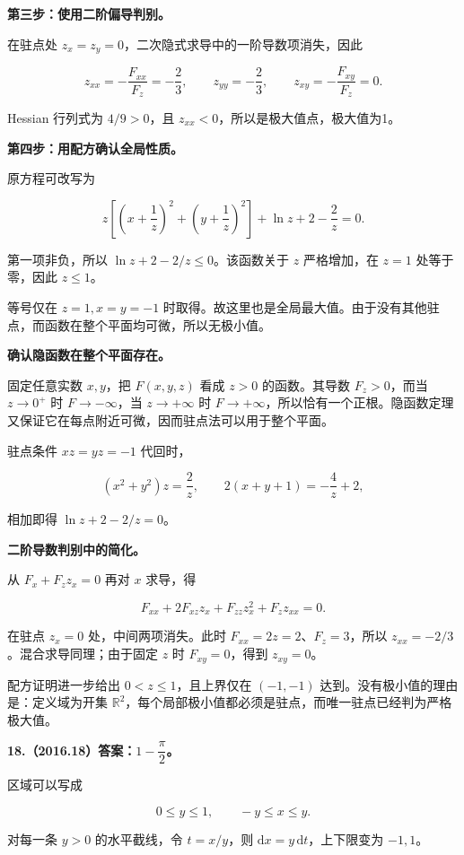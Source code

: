\documentclass[UTF8,11pt,fontset=windows]{ctexart}
\begin{document}
\textbf{第三步：使用二阶偏导判别。}

在驻点处 $z_x=z_y=0$，二次隐式求导中的一阶导数项消失，因此

$$
z_{xx}=-\frac{F_{xx}}{F_z}=-\frac23,
\qquad z_{yy}=-\frac23,
\qquad z_{xy}=-\frac{F_{xy}}{F_z}=0.
$$

Hessian 行列式为 $4/9>0$，且 $z_{xx}<0$，所以是极大值点，极大值为1。

\textbf{第四步：用配方确认全局性质。}

原方程可改写为

$$
z\left[\left(x+\frac1z\right)^2+\left(y+\frac1z\right)^2\right]
+\ln z+2-\frac2z=0.
$$

第一项非负，所以 $\ln z+2-2/z\le0$。该函数关于 $z$ 严格增加，在 $z=1$ 处等于零，因此 $z\le1$。

等号仅在 $z=1,x=y=-1$ 时取得。故这里也是全局最大值。由于没有其他驻点，而函数在整个平面均可微，所以无极小值。

\textbf{确认隐函数在整个平面存在。}

固定任意实数 $x,y$，把 $F(x,y,z)$ 看成 $z>0$ 的函数。其导数 $F_z>0$，而当 $z\to0^+$ 时 $F\to-\infty$，当 $z\to+\infty$ 时 $F\to+\infty$，所以恰有一个正根。隐函数定理又保证它在每点附近可微，因而驻点法可以用于整个平面。

驻点条件 $xz=yz=-1$ 代回时，

$$
(x^2+y^2)z=\frac2z,
\qquad
2(x+y+1)=-\frac4z+2,
$$

相加即得 $\ln z+2-2/z=0$。

\textbf{二阶导数判别中的简化。}

从 $F_x+F_z z_x=0$ 再对 $x$ 求导，得

$$
F_{xx}+2F_{xz}z_x+F_{zz}z_x^2+F_z z_{xx}=0.
$$

在驻点 $z_x=0$ 处，中间两项消失。此时 $F_{xx}=2z=2$、$F_z=3$，所以 $z_{xx}=-2/3$。混合求导同理；由于固定 $z$ 时 $F_{xy}=0$，得到 $z_{xy}=0$。

配方证明进一步给出 $0<z\le1$，且上界仅在 $(-1,-1)$ 达到。没有极小值的理由是：定义域为开集 $\mathbb R^2$，每个局部极小值都必须是驻点，而唯一驻点已经判为严格极大值。

\clearpage

\textbf{18.（2016.18）答案：$1-\dfrac\pi2$。}

区域可以写成

$$
0\le y\le1,\qquad-y\le x\le y.
$$

对每一条 $y>0$ 的水平截线，令 $t=x/y$，则 $\mathrm dx=y\,\mathrm dt$，上下限变为 $-1,1$。
\end{document}
